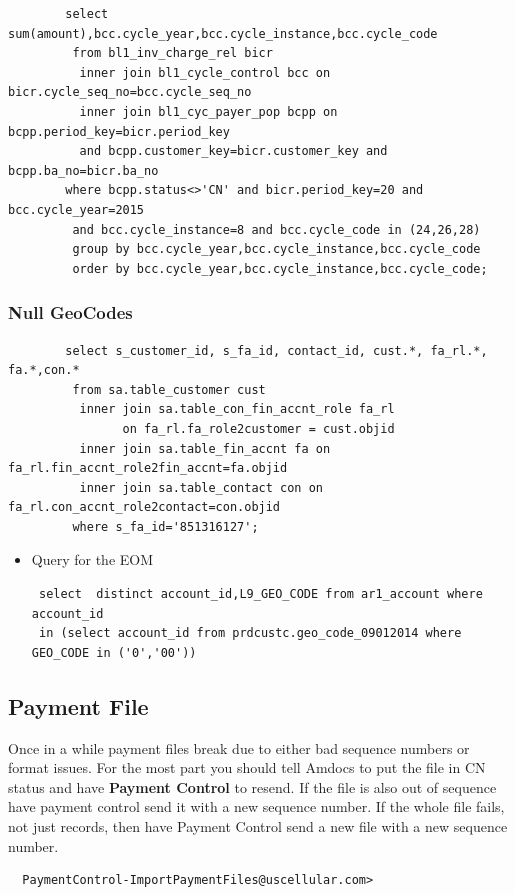 \documentclass[12pt,twoside]{article}
\begin{document}
\begin{verbatim}
        select sum(amount),bcc.cycle_year,bcc.cycle_instance,bcc.cycle_code
         from bl1_inv_charge_rel bicr 
          inner join bl1_cycle_control bcc on bicr.cycle_seq_no=bcc.cycle_seq_no 
          inner join bl1_cyc_payer_pop bcpp on bcpp.period_key=bicr.period_key 
          and bcpp.customer_key=bicr.customer_key and bcpp.ba_no=bicr.ba_no
        where bcpp.status<>'CN' and bicr.period_key=20 and bcc.cycle_year=2015 
         and bcc.cycle_instance=8 and bcc.cycle_code in (24,26,28)
         group by bcc.cycle_year,bcc.cycle_instance,bcc.cycle_code
         order by bcc.cycle_year,bcc.cycle_instance,bcc.cycle_code;
\end{verbatim}
\subsubsection{Null GeoCodes}
\label{sec-11-3-3}

\begin{verbatim}
        select s_customer_id, s_fa_id, contact_id, cust.*, fa_rl.*, fa.*,con.*
         from sa.table_customer cust
          inner join sa.table_con_fin_accnt_role fa_rl 
                on fa_rl.fa_role2customer = cust.objid
          inner join sa.table_fin_accnt fa on fa_rl.fin_accnt_role2fin_accnt=fa.objid
          inner join sa.table_contact con on fa_rl.con_accnt_role2contact=con.objid
         where s_fa_id='851316127';
\end{verbatim}
\begin{itemize}

\item Query for the EOM
\label{sec-11-3-3-1}%
\begin{verbatim}
 select  distinct account_id,L9_GEO_CODE from ar1_account where account_id 
 in (select account_id from prdcustc.geo_code_09012014 where GEO_CODE in ('0','00'))
\end{verbatim}
\end{itemize} %
\subsection{Payment File}
\label{sec-11-4}

   Once in a while payment files break due to either bad sequence numbers or format issues. For the most part you should tell Amdocs to put the file in CN status and have \textbf{Payment Control} to resend.
   If the file is also out of sequence have payment control send it with a new sequence number. If the whole file fails, not just records, then have Payment Control send a new file with a new sequence number.
\begin{verbatim}
  PaymentControl-ImportPaymentFiles@uscellular.com>
\end{verbatim}
\end{document}
